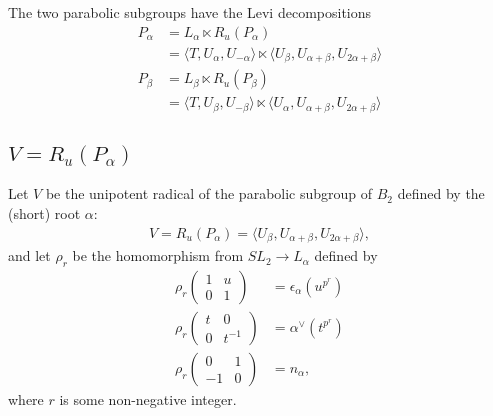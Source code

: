 																											The two parabolic subgroups have the Levi decompositions
																											\begin{align*}
																											P_\alpha &= L_\alpha \ltimes R_u(P_\alpha) \\
																																	&= \langle T, U_\alpha, U_{-\alpha} \rangle \ltimes \langle U_\beta, U_{\alpha + \beta}, U_{2\alpha + \beta} \rangle \\
																																	P_\beta &= L_\beta \ltimes R_u(P_\beta) \\
																																	&= \langle T, U_\beta, U_{-\beta} \rangle \ltimes \langle U_\alpha, U_{\alpha+\beta}, U_{2\alpha + \beta} \rangle
																																	\end{align*}

																																	\subsection{$V = R_u(P_\alpha)$}
																																	\label{b2:alpha}

																																	Let $V$ be the unipotent radical of the parabolic subgroup of $B_2$ defined by the (short) root $\alpha$:
																																	\begin{align*}
																																	V=R_u(P_\alpha)=\langle U_\beta, U_{\alpha + \beta}, U_{2\alpha + \beta} \rangle,
																																	\end{align*}
																																	and let $\rho_r$ be the homomorphism from $SL_2 \rightarrow L_\alpha$ defined by
																																	\begin{align*}
																																	\rho_r\left(\begin{matrix} 1 & u \\ 0 & 1\end{matrix}\right) &= \epsilon_\alpha(u^{p^r}) \\
																																		\rho_r\left(\begin{matrix} t & 0 \\ 0 & t^{-1}\end{matrix}\right) &= \alpha ^\vee(t^{p^r}) \\
																																		\rho_r\left(\begin{matrix} 0 & 1 \\ -1 & 0\end{matrix}\right) &= n_ \alpha,
																																	\end{align*}
																																	where $r$ is some non-negative integer.

